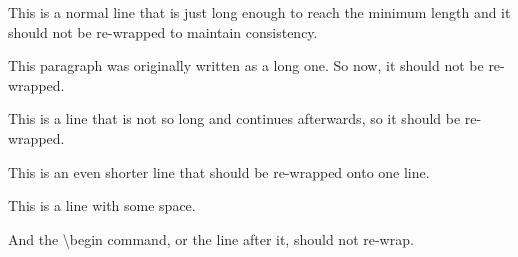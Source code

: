 \documentclass{article}
\begin{document}

This is a normal line that is just long enough to reach the minimum length
and it should not be re-wrapped to maintain consistency.

This paragraph was originally written as a long one.
So now, it should not be re-wrapped.

This is a line that is not so long and continues afterwards, so it
should be re-wrapped.

This is an even shorter line that should be re-wrapped onto one line.

This is a line with some space.
\begin{definition}
  And the \textbackslash{}begin command, or the line after it, should
  not re-wrap.
\end{definition}
\end{document}

